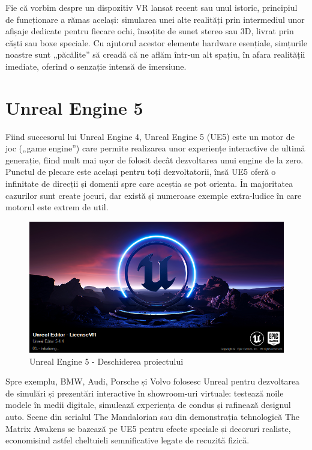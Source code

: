 Fie că vorbim despre un dispozitiv VR lansat recent sau unul istoric, principiul de funcționare a rămas același: simularea unei alte realități prin intermediul unor afișaje dedicate pentru fiecare ochi, însoțite de sunet stereo sau 3D, livrat prin căști sau boxe speciale. Cu ajutorul acestor elemente hardware esențiale, simțurile noastre sunt „păcălite” să creadă că ne aflăm într-un alt spațiu, în afara realității imediate, oferind o senzație intensă de imersiune.

\section{Unreal Engine 5}

Fiind succesorul lui Unreal Engine 4, Unreal Engine 5 (UE5) este un motor de joc („game engine”) care permite realizarea unor experiențe interactive de ultimă generație, fiind mult mai ușor de folosit decât dezvoltarea unui engine de la zero. Punctul de plecare este același pentru toți dezvoltatorii, însă UE5 oferă o infinitate de direcții și domenii spre care aceștia se pot orienta. În majoritatea cazurilor sunt create jocuri, dar există și numeroase exemple extra-ludice în care motorul este extrem de util.

\begin{figure} [htp] 
\centering 
\includegraphics [width=12cm]
{continut/capitol2/figuri/ue5.png} 
\caption{Unreal Engine 5 - Deschiderea proiectului} 
\label{fig:VR} 
\end{figure}


Spre exemplu, BMW, Audi, Porsche și Volvo folosesc Unreal pentru dezvoltarea de simulări și prezentări interactive în showroom-uri virtuale: testează noile modele în medii digitale, simulează experiența de condus și rafinează designul auto. Scene din serialul The Mandalorian sau din demonstrația tehnologică The Matrix Awakens se bazează pe UE5 pentru efecte speciale și decoruri realiste, economisind astfel cheltuieli semnificative legate de recuzită fizică.

